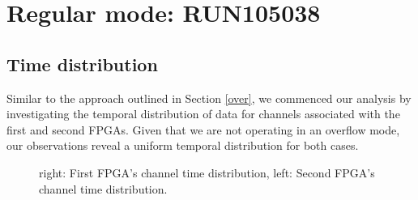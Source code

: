 
\section{Regular mode: RUN105038}
\subsection{Time distribution}
Similar to the approach outlined in Section \ref{over}, we commenced our analysis by investigating the temporal distribution of data for channels associated with the first and second FPGAs. Given that we are not operating in an overflow mode, our observations reveal a uniform temporal distribution for both cases.
\begin{figure}[H]
  \hspace{-0.5in}
  \caption{
    \label{fig:4}
    right: First FPGA's channel time distribution, left: Second FPGA's channel time distribution.
  }
\end{figure}
